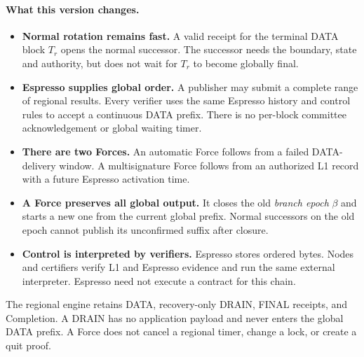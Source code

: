 \documentclass[11pt,a4paper]{article}
\newcommand{\defterm}[1]{\textcolor{rrBlue}{\textit{#1}}}
\begin{document}
\paragraph{What this version changes.}
\begin{itemize}
\item \textbf{Normal rotation remains fast.} A valid receipt for the
terminal DATA block $T_r$ opens the normal successor. The successor
needs the boundary, state and authority, but does not wait for $T_r$
to become globally final.
\item \textbf{Espresso supplies global order.} A publisher may submit
a complete range of regional results. Every verifier uses the same
Espresso history and control rules to accept a continuous DATA prefix.
There is no per-block committee acknowledgement or global waiting timer.
\item \textbf{There are two Forces.} An automatic Force follows from
a failed DATA-delivery window. A multisignature Force follows from an
authorized L1 record with a future Espresso activation time.
\item \textbf{A Force preserves all global output.} It closes the old
\defterm{branch epoch} $\beta$ and starts a new one from the current
global prefix. Normal successors on the old epoch cannot publish its
unconfirmed suffix after closure.
\item \textbf{Control is interpreted by verifiers.} Espresso stores
ordered bytes. Nodes and certifiers verify L1 and Espresso evidence and
run the same external interpreter. Espresso need not execute a contract
for this chain.
\end{itemize}

The regional engine retains DATA, recovery-only DRAIN, FINAL receipts,
and Completion. A DRAIN has no application payload and never enters the
global DATA prefix. A Force does not cancel a regional timer, change a
lock, or create a quit proof.
\end{document}
